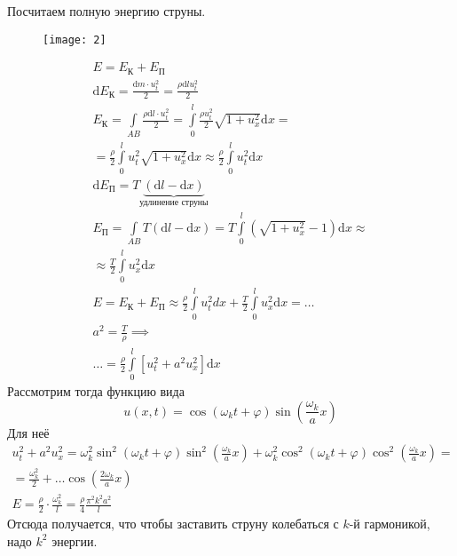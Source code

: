 Посчитаем полную энергию струны.

\begin{figure}[H]
\texttt{[image: 2]}
\end{figure}
\[
	\begin{aligned}
	E = E_\text{К}+E_\text{П} \\
	\mathrm{d}E_\text{К} = \frac{\mathrm{d}m \cdot u_t^2}{2} = \frac{\rho \mathrm{d}l u_t^2}{2} \\
	E_\text{К} = \int\limits_{AB} \frac{\rho \mathrm{d}l \cdot u_t^2}{2} = \int\limits_0^l \frac{\rho u_t^2}{2} \sqrt{1+u_x^2} \mathrm{d}x = \\
	= \frac{\rho}{2} \int\limits_0^l u_t^2 \sqrt{1+u_x^2} \mathrm{d}x \approx \frac{\rho}{2} \int\limits_0^l u_t^2 \mathrm{d}x \\
	\mathrm{d} E_\text{П} = T \underbrace{\left( \mathrm{d}l-\mathrm{d}x\right)}_{\text{удлинение струны}} \\
	E_\text{П} = \int\limits_{AB} T(\mathrm{d}l-\mathrm{d}x) = T \int\limits_0^l \left( \sqrt{1+u_x^2} - 1\right)\mathrm{d}x \approx \\
	\approx \frac{T}{2} \int\limits_0^l u_x^2 \mathrm{d}x \\
	E = E_\text{К} + E_\text{П} \approx \frac{\rho}{2} \int\limits_0^l u_t^2 dx + \frac{T}{2} \int\limits_0^l u_x^2 \mathrm{d}x = \dots\\
	a^2 = \frac{T}{\rho} \implies \\
	\dots = \frac{\rho}{2} \int\limits_0^l \left[ u_t^2 + a^2 u_x^2\right] \mathrm{d}x
\end{aligned}
\]
Рассмотрим тогда функцию вида
\[
	u(x,t) = \cos \left( \omega_k t + \varphi\right) \sin \left( \frac{\omega_k}{a} x\right)
\]
Для неё
\[
	\begin{aligned}
	u_t^2 + a^2 u_x^2 = \omega_k^2 \sin^2 \left( \omega_k t + \varphi\right) \sin^2 \left( \frac{\omega_k}{a} x\right) + \omega_k^2 \cos^2 \left( \omega_k t + \varphi\right)\cos^2 \left( \frac{\omega_k}{a} x\right) = \\
	= \frac{\omega_k^2}{2} + \dots \cos \left( \frac{2 \omega_k}{a} x\right) \\
	E = \frac{\rho}{2} \cdot \frac{\omega_k^2} l = \frac{\rho}{4} \frac{\pi^2 k^2 a^2}{l}
\end{aligned}
\]
Отсюда получается, что чтобы заставить струну колебаться с $k$-й гармоникой, надо $k^2$ энергии.
